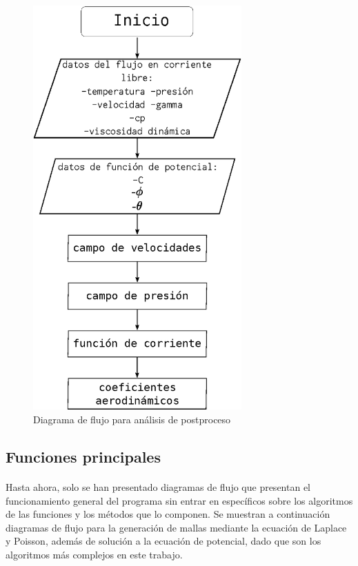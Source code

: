 \documentclass[letterpaper, openright, 12pt]{book}
\begin{document}
    \begin{figure}[htbp!]
        \centering
        \includegraphics[keepaspectratio, width=80mm]{./Imagenes/flujo_potencial_after}
        \caption{Diagrama de flujo para análisis de postproceso}
        \label{flujo_potencial_after}
    \end{figure}

    \subsection{Funciones principales}
    \paragraph*{}
        Hasta ahora, solo se han presentado diagramas de flujo que presentan el
        funcionamiento general del programa sin entrar en específicos sobre los
        algoritmos de las funciones y los métodos que lo componen. Se muestran a
        continuación diagramas de flujo para la generación de mallas mediante la
        ecuación de Laplace y Poisson, además de solución a la ecuación de
        potencial, dado que son los algoritmos más complejos en este trabajo.
\end{document}
